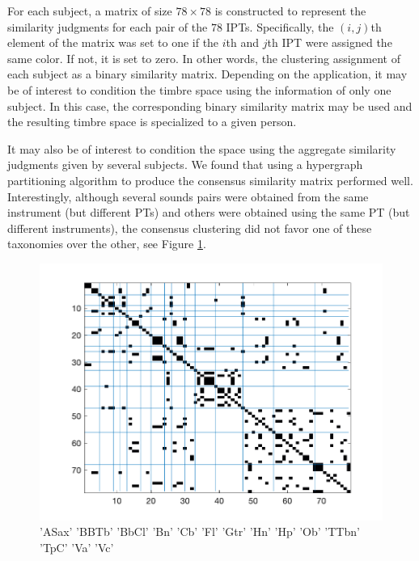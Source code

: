 \documentclass{bmcart}
\begin{document}
For each subject, a matrix of size $78 \times 78$ is constructed to represent the similarity judgments for each pair of the $78$ IPTs.
Specifically, the $(i, j)$th element of the matrix was set to one if the $i$th and $j$th IPT were assigned the same color.
If not, it is set to zero.
In other words, the clustering assignment of each subject as a binary similarity matrix. Depending on the application, it may be of interest to condition the timbre space using the information of only one subject. In this case, the corresponding binary similarity matrix may be used and the resulting timbre space is specialized to a given person.


It may also be of interest to condition the space using the aggregate similarity judgments given by several subjects. We found that using a hypergraph partitioning algorithm \cite{kernighan1970efficient,han1997scalable,strehl2002cluster} to produce the consensus similarity matrix performed well. Interestingly, although several sounds pairs were obtained from the same instrument (but different PTs) and others were obtained using the same PT (but different instruments), the consensus clustering did not favor one of these taxonomies over the other, see Figure \ref{fig:consensusVsIpt}.

\begin{figure}
\center
\includegraphics[width = \textwidth]{../code/xp2/consensusVsI.png}
\caption{'ASax'    'BBTb'    'BbCl'    'Bn'    'Cb'    'Fl'    'Gtr'    'Hn'    'Hp'    'Ob'    'TTbn'    'TpC'  'Va'    'Vc'}
\label{fig:consensusVsIpt}
\end{figure}
\end{document}
